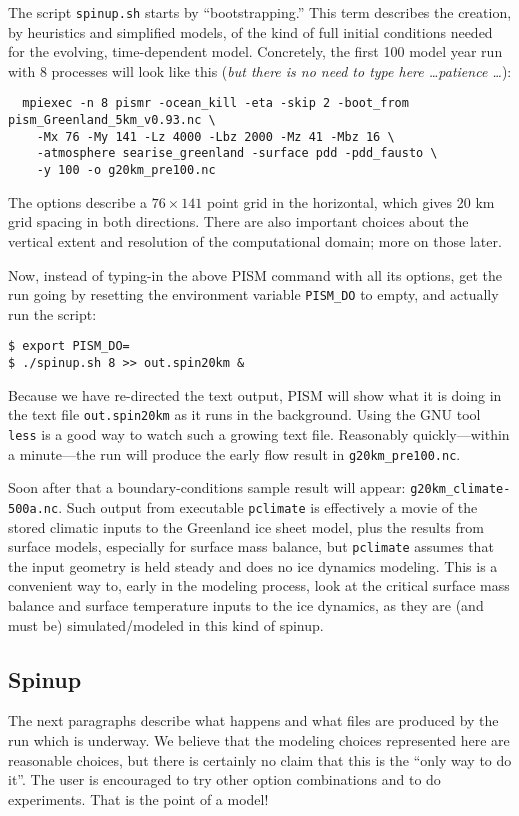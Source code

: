 The script \texttt{spinup.sh} starts by ``bootstrapping.''  This term describes the creation, by heuristics and simplified models, of the kind of full initial conditions needed for the evolving, time-dependent model.  Concretely, the first 100 model year run with 8 processes will look like this (\emph{but there is no need to type here \dots patience \dots}):
\small
\begin{verbatim}
  mpiexec -n 8 pismr -ocean_kill -eta -skip 2 -boot_from pism_Greenland_5km_v0.93.nc \
    -Mx 76 -My 141 -Lz 4000 -Lbz 2000 -Mz 41 -Mbz 16 \
    -atmosphere searise_greenland -surface pdd -pdd_fausto \
    -y 100 -o g20km_pre100.nc
\end{verbatim}
\normalsize
The options describe a $76\times 141$ point grid in the horizontal, which gives 20 km grid spacing in both directions.  There are also important choices about the vertical extent and resolution of the computational domain; more on those later.  

Now, instead of typing-in the above PISM command with all its options, get the run going by resetting the environment variable \texttt{PISM_DO} to empty, and actually run the script:
\begin{verbatim}
$ export PISM_DO=
$ ./spinup.sh 8 >> out.spin20km &
\end{verbatim}
\noindent Because we have re-directed the text output, PISM will show what it is doing in the text file \texttt{out.spin20km} as it runs in the background.  Using the GNU tool \texttt{less} is a good way to watch such a growing text file.  Reasonably quickly---within a minute---the run will produce the early flow result in \texttt{g20km_pre100.nc}.

Soon after that a boundary-conditions sample result will appear: \texttt{g20km_climate-500a.nc}.  Such output from executable \texttt{pclimate} is effectively a movie of the stored climatic inputs to the Greenland ice sheet model, plus the results from surface models, especially for surface mass balance, but \texttt{pclimate} assumes that the input geometry is held steady and does no ice dynamics modeling.  This is a convenient way to, early in the modeling process, look at the critical surface mass balance and surface temperature inputs to the ice dynamics, as they are (and must be) simulated/modeled in this kind of spinup.

\subsection{Spinup}  \label{subsect:spinupsketch}  The next paragraphs describe what happens and what files are produced by the run which is underway.  We believe that the modeling choices represented here are reasonable choices, but there is certainly no claim that this is the ``only way to do it''.  The user is encouraged to try other option combinations and to do experiments.  That is the point of a model!

